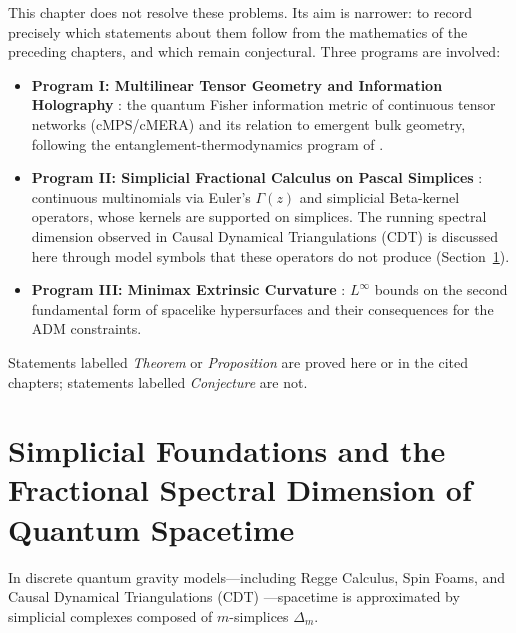 \documentclass[11pt,a4paper,reqno]{amsart}
\theoremstyle{definition}
\numberwithin{equation}{section}
\begin{document}
This chapter does not resolve these problems. Its aim is narrower: to record precisely which statements about them follow from the mathematics of the preceding chapters, and which remain conjectural. Three programs are involved:
\begin{itemize}
    \item \textbf{Program I: Multilinear Tensor Geometry and Information Holography} \cite{silvafilho2026functional, silvafilho2026flows, silvafilho2026spacetime}: the quantum Fisher information metric of continuous tensor networks (cMPS/cMERA) and its relation to emergent bulk geometry, following the entanglement-thermodynamics program of \cite{faulkner2014gravitation, faulkner2017nonlinear}.
    \item \textbf{Program II: Simplicial Fractional Calculus on Pascal Simplices} \cite{silvafilho2026pascal}: continuous multinomials via Euler's $\Gamma(z)$ and simplicial Beta-kernel operators, whose kernels are supported on simplices. The running spectral dimension observed in Causal Dynamical Triangulations (CDT) \cite{ambjorn2005spectral, carlip2017dimension} is discussed here through model symbols that these operators do not produce (Section~\ref{sec:simplicial_fractional}).
    \item \textbf{Program III: Minimax Extrinsic Curvature} \cite{silvafilho2026noneuclidean}: $L^\infty$ bounds on the second fundamental form of spacelike hypersurfaces and their consequences for the ADM constraints.
\end{itemize}
Statements labelled \emph{Theorem} or \emph{Proposition} are proved here or in the cited chapters; statements labelled \emph{Conjecture} are not.

\section{Simplicial Foundations and the Fractional Spectral Dimension of Quantum Spacetime}
\label{sec:simplicial_fractional}

In discrete quantum gravity models—including Regge Calculus, Spin Foams, and Causal Dynamical Triangulations (CDT) \cite{ambjorn2005spectral}—spacetime is approximated by simplicial complexes composed of $m$-simplices $\Delta_m$.
\end{document}
